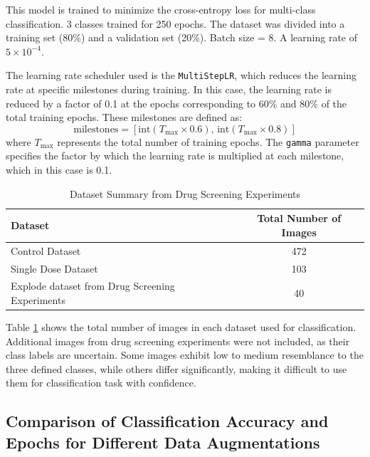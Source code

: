 This model is trained to minimize the cross-entropy loss for multi-class classification.
3 classes trained for 250 epochs. The dataset was divided into a training set (80\%) and a validation set (20\%). Batch size = 8.  A learning rate of \( 5 \times 10^{-4} \). 

The learning rate scheduler used is the \texttt{MultiStepLR}, which reduces the learning rate at specific milestones during training. In this case, the learning rate is 
reduced by a factor of 0.1 at the epochs corresponding to 60\% and 80\% of the total training epochs. These milestones are defined as:
\[
\text{milestones} = \left[ \text{int}(T_{\text{max}} \times 0.6), \, \text{int}(T_{\text{max}} \times 0.8) \right]
\]
where \( T_{\text{max}} \) represents the total number of training epochs. The \texttt{gamma} parameter specifies the factor by which the learning rate is multiplied at each 
milestone, which in this case is 0.1.

\begin{table}[h!]
    \centering
    \caption{Dataset Summary from Drug Screening Experiments}
    \label{tab:dataset_summary}
    \begin{tabular}{lc}
    \toprule
    \textbf{Dataset}                              & \textbf{Total Number of Images} \\ 
    \midrule
    Control Dataset                             & 472                            \\ 
    Single Dose Dataset                           & 103                            \\ 
    Explode dataset from Drug Screening Experiments & 40                             \\ 
    \bottomrule
    \end{tabular}
\end{table}
Table \ref{tab:dataset_summary} shows the total number of images in each dataset used for classification. Additional images from drug screening experiments were not included, as their class labels are uncertain. Some images exhibit low to medium resemblance to the three defined classes, while others differ significantly, making it difficult to use them for classification task with confidence.
\subsection{Comparison of Classification Accuracy and Epochs for Different Data Augmentations}


